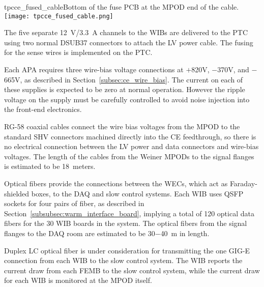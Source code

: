 \begin{cdrfigure}{tpcce_fused_cable}{Bottom of the fuse PCB at the MPOD end of the cable.}
\texttt{[image: tpcce\_fused\_cable.png]}
\end{cdrfigure}

The five separate 12~V/3.3~A channels to the WIBs are delivered to the PTC using two normal DSUB37 connectors to
attach the LV power cable. The fusing for the sense wires is implemented on the PTC.

Each APA requires three wire-bias voltage connections 
at $+$820V, $-$370V, and $-$665V, as described in Section~\ref{subsec:ce_wire_bias}.
The current on each of these supplies is expected to be zero at normal operation.
However the ripple voltage on the supply must be carefully controlled 
to avoid noise injection into the front-end electronics.

RG-58 coaxial cables connect the wire bias voltages from the MPOD to the standard SHV
connectors machined directly into the CE feedthrough, so there is no electrical connection between 
the LV power and data connectors and wire-bias voltages. The length of the cables from the Weiner MPODs
to the signal flanges is estimated to be 18~meters.


Optical fibers provide the connections between the WECs, which act as
Faraday-shielded boxes, to the DAQ and slow control systems.
Each WIB uses QSFP sockets for 
four pairs of fiber, as described in Section~\ref{subsubsec:warm_interface_board}, 
implying a total of 120 optical data fibers for the 30 WIB boards in the system. The optical fibers from
the signal flanges to the DAQ room are estimated to be 30$-$40~m in length.

Duplex LC optical fiber is under consideration for transmitting the one GIG-E connection from each
WIB to the slow control system. The WIB reports the current draw from each FEMB to the slow control system, while the 
current draw for each WIB is monitored at the MPOD itself.

